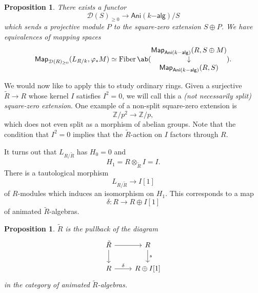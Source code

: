 \documentclass[10pt]{amsart}
\newtheorem{prop}[thm]{Proposition}
\theoremstyle{definition}
\theoremstyle{remark}
\theoremstyle{plain}
\theoremstyle{definition}
\theoremstyle{remark}
\newcommand{\Z}{\mathbb{Z}}
\newcommand{\mc}[1]{\mathcal{#1}}
\newcommand{\on}[1]{\operatorname{#1}}
\newcommand{\ms}[1]{\mathsf{#1}}
\newcommand{\1}{\mathbf{1}}
\newcommand{\2}{\mathbf{2}}
\newcommand{\3}{\mathbf{3}}
\begin{document}
\begin{prop}
    There exists a functor
    \[ \mc{D}(S)_{\geq 0} \to \ms{Ani}(k\ms{-alg})/S \]
    which sends a projective module $P$ to the square-zero extension $S \oplus P$. We have equivalences of mapping spaces
    \[ \ms{Map}_{\mc{D}(R)_{\geq 0}} (L_{R/k}, \varphi_* M) \simeq \on{Fiber} \ab(\begin{matrix}\ms{Map}_{\ms{Ani}(k\ms{-alg})}(R, S \oplus M) \\ \downarrow \\ \ms{Map}_{\ms{Ani}(k\ms{-alg})}(R,S)\end{matrix}). \]
\end{prop}

We would now like to apply this to study ordinary rings. Given a surjective $\tilde{R} \to R$ whose kernel $I$ satisfies $I^2 = 0$, we will call this a \textit{(not necessarily split) square-zero extension}. One example of a non-split square-zero extension is
\[ \Z/p^2 \to \Z/p, \]
which does not even split as a morphism of abelian groups. Note that the condition that $I^2 = 0$ implies that the $\tilde{R}$-action on $I$ factors through $R$.

It turns out that $L_{R/\tilde{R}}$ has $H_0 = 0$ and 
\[ H_1 = R \otimes_{\tilde{R}} I = I. \]
There is a tautological morphism
\[ L_{R/\tilde{R}} \to I[1] \]
of $R$-modules which induces an isomorphism on $H_1$. This corresponds to a map
\[ \delta \colon R \to R \oplus I[1] \]
of animated $\tilde{R}$-algebras.

\begin{prop}
    $\tilde{R}$ is the pullback of the diagram
    \begin{equation*}
    \begin{tikzcd}
        \tilde{R} \ar{r} \ar{d} & R \ar{d}{s} \\
        R \ar{r}{\delta} & R \oplus I[1]
    \end{tikzcd}
    \end{equation*}
    in the category of animated $\tilde{R}$-algebras.
\end{prop}
\end{document}

